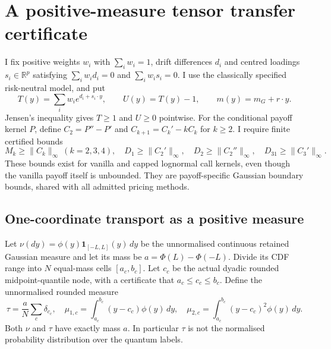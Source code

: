 \section{A positive-measure tensor transfer certificate}
\label{supp:positive-tensor-transfer}

I fix positive weights $w_i$ with $\sum_iw_i=1$, drift differences
$d_i$ and centred loadings $s_i\in\mathbb R^p$ satisfying
$\sum_iw_id_i=0$ and $\sum_iw_is_i=0$. I use the classically specified
risk-neutral model, and put
\[
 T(y)=\sum_iw_i e^{d_i+s_i\cdot y},\qquad U(y)=T(y)-1,
 \qquad m(y)=m_G+r\cdot y.
\]
Jensen's inequality gives $T\geq1$ and $U\geq0$ pointwise. For the
conditional payoff kernel $P$, define $C_2=P''-P'$ and
$C_{k+1}=C_k'-kC_k$ for $k\geq2$. I require finite certified bounds
\[
 M_k\geq\|C_k\|_\infty\ (k=2,3,4),\quad
 D_1\geq\|C_2'\|_\infty,\quad D_2\geq\|C_2''\|_\infty,
 \quad D_{31}\geq\|C_3'\|_\infty.
\]
These bounds exist for vanilla and capped lognormal call kernels, even
though the vanilla payoff itself is unbounded. They are payoff-specific
Gaussian boundary bounds, shared with all admitted pricing methods.

\subsection{One-coordinate transport as a positive measure}

Let $\nu(dy)=\phi(y)\mathbf1_{[-L,L]}(y)\,dy$ be the unnormalised
continuous retained Gaussian measure and let its mass be
$a=\Phi(L)-\Phi(-L)$. Divide its CDF range into $N$ equal-mass cells
$[a_c,b_c]$. Let $c_c$ be the actual dyadic rounded midpoint-quantile
node, with a certificate that $a_c\leq c_c\leq b_c$. Define the
unnormalised rounded measure
\[
 \tau=\frac aN\sum_c\delta_{c_c},\quad
 \mu_{1,c}=\int_{a_c}^{b_c}(y-c_c)\phi(y)\,dy,\quad
 \mu_{2,c}=\int_{a_c}^{b_c}(y-c_c)^2\phi(y)\,dy.
\]
Both $\nu$ and $\tau$ have exactly mass $a$. In particular $\tau$ is
not the normalised probability distribution over the quantum labels.


